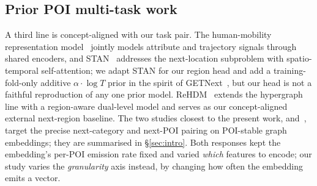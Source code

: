 \subsection{Prior POI multi-task work}
\label{subsec:related-poi-mtl}

A third line is concept-aligned with our task pair. The human-mobility representation model~\cite{chen2020hmrm} jointly models attribute and trajectory signals through shared encoders, and STAN~\cite{luo2021stan} addresses the next-location subproblem with spatio-temporal self-attention; we adapt STAN for our region head and add a training-fold-only additive $\alpha\!\cdot\!\log T$ prior in the spirit of GETNext~\cite{yang2022getnext}, but our head is not a faithful reproduction of any one prior model. ReHDM~\cite{li2025rehdm} extends the hypergraph line with a region-aware dual-level model and serves as our concept-aligned external next-region baseline. The two studies closest to the present work, \cite{silva2025mtlnet} and~\cite{paiva2026courb}, target the precise next-category and next-POI pairing on POI-stable graph embeddings; they are summarised in \S\ref{sec:intro}. Both responses kept the embedding's per-POI emission rate fixed and varied \emph{which} features to encode; our study varies the \emph{granularity} axis instead, by changing how often the embedding emits a vector.
